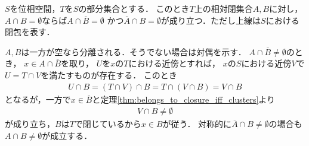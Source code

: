 	\begin{screen}
		\begin{thm}[部分空間の互いに素な閉集合はもとの空間で分離される]
		\label{thm:disjoint_relative_closed_sets_are_separated}
			$S$を位相空間，$T$を$S$の部分集合とする．
			このとき$T$上の相対閉集合$A,B$に対し，
			$A \cap B = \emptyset$ならば$A \cap \overline{B} = \emptyset$
			かつ$\overline{A} \cap B = \emptyset$が成り立つ．ただし上線は$S$における閉包を表す．
		\end{thm}
	\end{screen}
	
	\begin{prf}
		$A,B$は一方が空なら分離される．そうでない場合は対偶を示す．
		$A \cap \overline{B} \neq \emptyset$のとき，
		$x \in A \cap \overline{B}$を取り，
		$U$を$x$の$T$における近傍とすれば，
		$x$の$S$における近傍$V$で$U = T \cap V$を満たすものが存在する．
		このとき
		\begin{align}
			U \cap B = (T \cap V) \cap B = T \cap (V \cap B) = V \cap B
		\end{align}
		となるが，一方で$x \in \overline{B}$と定理\ref{thm:belongs_to_closure_iff_clusters}より
		\begin{align}
			V \cap B \neq \emptyset
		\end{align}
		が成り立ち，$B$は$T$で閉じているから$x \in B$が従う．
		対称的に$\overline{A} \cap B \neq \emptyset$の場合も
		$A \cap B \neq \emptyset$が成立する．
		\QED
	\end{prf}
	
